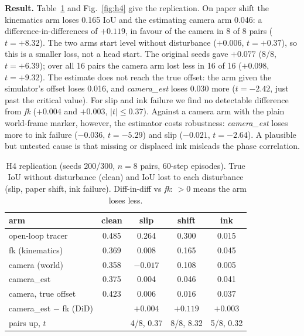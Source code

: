 \documentclass[conference]{IEEEtran}
\begin{document}
\textbf{Result.} Table~\ref{tab:h4} and Fig.~\ref{fig:h4} give the replication. On paper shift the
kinematics arm loses 0.165 IoU and the estimating camera arm 0.046: a difference-in-differences %
of $+0.119$, in favour of the camera in 8 of 8 pairs ($t=+8.32$). The two arms start level %
without disturbance ($+0.006$, $t=+0.37$), so this is a smaller loss, not a head start. %
The original seeds gave $+0.077$ (8/8, $t=+6.39$); over all 16 pairs the camera arm %
lost less in 16 of 16 ($+0.098$, $t=+9.32$). The estimate does not reach the true offset: %
the arm given the simulator's offset loses 0.016, and \emph{camera\_est} loses 0.030 more %
($t=-2.42$, just past the critical value). For slip and ink failure we find no detectable difference %
from \emph{fk} ($+0.004$ and $+0.003$, $|t| \le 0.37$). Against a camera arm with the %
plain world-frame marker, however, the estimator costs robustness: \emph{camera\_est} loses
more to ink failure ($-0.036$, $t=-5.29$) and slip ($-0.021$, $t=-2.64$). A plausible but %
untested cause is that missing or displaced ink misleads the phase correlation.

\begin{table}[t]
\caption{H4 replication (seeds 200/300, $n=8$ pairs, 60-step episodes). True IoU without
disturbance (clean) and IoU lost to each disturbance (slip, paper shift, ink failure). Diff-in-diff vs \emph{fk}: $>0$ means the
arm loses less.}
\label{tab:h4}
\centering
\small
\setlength{\tabcolsep}{3pt}
\begin{tabular}{lcccc}
\toprule
arm & clean & slip & shift & ink \\
\midrule
open-loop tracer & 0.485 & 0.264 & 0.300 & 0.015 \\ %
fk (kinematics) & 0.369 & 0.008 & 0.165 & 0.045 \\ %
camera (world) & 0.358 & $-0.017$ & 0.108 & 0.005 \\ %
camera\_est & 0.375 & 0.004 & 0.046 & 0.041 \\ %
camera, true offset & 0.423 & 0.006 & 0.016 & 0.037 \\ %
\midrule
camera\_est $-$ fk (DiD) & & $+0.004$ & $+0.119$ & $+0.003$ \\ %
\quad pairs up, $t$ & & 4/8, 0.37 & 8/8, 8.32 & 5/8, 0.32 \\ %
\bottomrule
\end{tabular}
\end{table}
\end{document}
